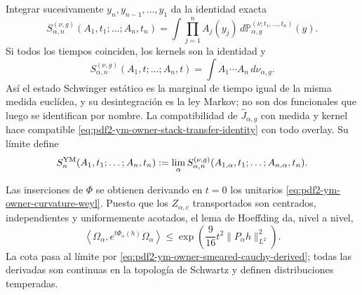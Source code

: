 Integrar sucesivamente $y_n,y_{n-1},\ldots,y_1$ da la identidad exacta
\begin{equation}\label{eq:pdf2-ym-owner-stack-transfer-identity}
 S_{\alpha,n}^{(\nu,g)}(A_1,t_1;\ldots;A_n,t_n)
 =\int\prod_{j=1}^nA_j(y_j)\,
   d\mathbb P_{\alpha,g}^{(\nu;t_1,\ldots,t_n)}(y).
\end{equation}
Si todos los tiempos coinciden, los kernels son la identidad y
\begin{equation}\label{eq:pdf2-ym-owner-static-is-stack}
 S_{\alpha,n}^{(\nu,g)}(A_1,t;\ldots;A_n,t)
 =\int A_1\cdots A_n\,d\nu_{\alpha,g}.
\end{equation}
Así el estado Schwinger estático es la marginal de tiempo igual de la misma
medida euclídea, y su desintegración es la ley Markov; no son dos funcionales
que luego se identifican por nombre. La
compatibilidad de $\widehat J_{\alpha,g}$ con medida y kernel hace compatible
\eqref{eq:pdf2-ym-owner-stack-transfer-identity} con todo overlay. Su límite define
\begin{equation}\label{eq:pdf2-ym-owner-schwinger-functionals}
 S_n^{\rm YM}(A_1,t_1;\ldots;A_n,t_n)
 :=\lim_{\alpha}S_{\alpha,n}^{(\nu,g)}
 (A_{1,\alpha},t_1;\ldots;A_{n,\alpha},t_n).
\end{equation}

Las inserciones de $\Phi$ se obtienen derivando en $t=0$ los unitarios
\eqref{eq:pdf2-ym-owner-curvature-weyl}. Puesto que los $Z_{\alpha,c}$ transportados
son centrados, independientes y uniformemente acotados, el lema de Hoeffding da,
nivel a nivel,
\begin{equation}\label{eq:pdf2-ym-owner-subgaussian-bound}
 \left\langle\Omega_\alpha,
 e^{t\Phi_\alpha(h)}\Omega_\alpha\right\rangle
 \le \exp\!\left(\frac9{16}t^2\|P_\alpha h\|_{L^2}^2\right).
\end{equation}
La cota pasa al límite por
\eqref{eq:pdf2-ym-owner-smeared-cauchy-derived}; todas las derivadas son continuas en
la topología de Schwartz y definen distribuciones temperadas.

